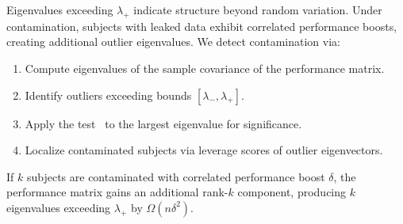 Eigenvalues exceeding $\lambda_+$ indicate structure beyond random variation.
Under contamination, subjects with leaked data exhibit correlated performance boosts, creating additional outlier eigenvalues.
We detect contamination via:
\begin{enumerate}[leftmargin=*,itemsep=0pt,topsep=0pt]
    \item Compute eigenvalues of the sample covariance of the performance matrix.
    \item Identify outliers exceeding \marchpast bounds $[\lambda_-, \lambda_+]$.
    \item Apply the \tw test~\citep{tracy1996orthogonal} to the largest eigenvalue for significance.
    \item Localize contaminated subjects via leverage scores of outlier eigenvectors.
\end{enumerate}

\begin{proposition}
If $k$ subjects are contaminated with correlated performance boost $\delta$, the performance matrix gains an additional rank-$k$ component, producing $k$ eigenvalues exceeding $\lambda_+$ by $\Omega(n\delta^2)$.
\end{proposition}
